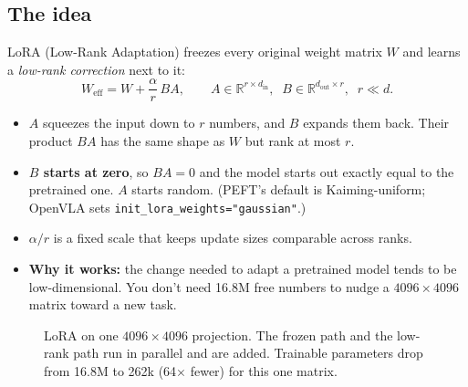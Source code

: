 \documentclass[11pt]{article}
\begin{document}
\subsection{The idea}
LoRA (Low-Rank Adaptation) \cite{hu2021lora} freezes every original weight matrix $W$ and learns a \emph{low-rank correction} next to it:
\begin{equation}
W_{\text{eff}} = W + \frac{\alpha}{r}\, B A,
\qquad A\in\mathbb{R}^{r\times d_{\text{in}}},\;\; B\in\mathbb{R}^{d_{\text{out}}\times r},\;\; r \ll d.
\end{equation}
\begin{itemize}
  \item $A$ squeezes the input down to $r$ numbers, and $B$ expands them back. Their product $BA$ has the same shape as $W$ but rank at most $r$.
  \item \textbf{$B$ starts at zero}, so $BA=0$ and the model starts out exactly equal to the pretrained one. $A$ starts random. (PEFT's default is Kaiming-uniform; OpenVLA sets \texttt{init\_lora\_weights="gaussian"}.)
  \item $\alpha/r$ is a fixed scale that keeps update sizes comparable across ranks.
  \item \textbf{Why it works:} the change needed to adapt a pretrained model tends to be low-dimensional. You don't need 16.8M free numbers to nudge a $4096\times4096$ matrix toward a new task.
\end{itemize}

\begin{figure}[h]
\centering
{}
\caption{LoRA on one $4096\times4096$ projection. The frozen path and the low-rank path run in parallel and are added. Trainable parameters drop from 16.8M to 262k (64$\times$ fewer) for this one matrix.}
\end{figure}
\end{document}
